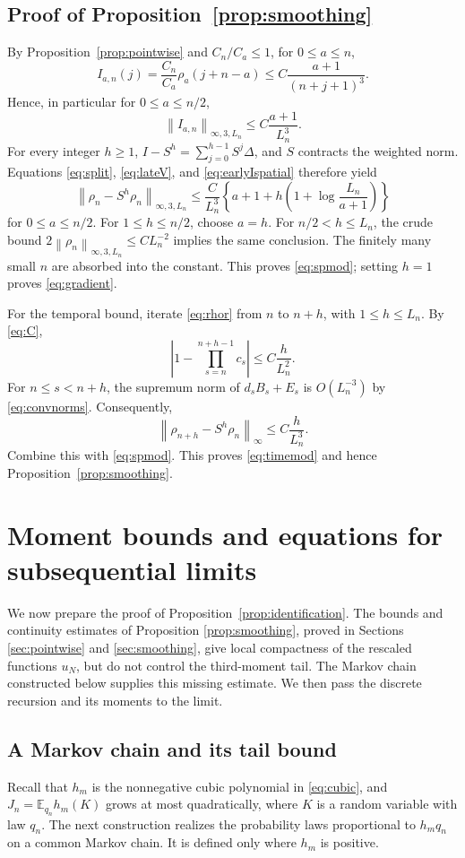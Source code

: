 \documentclass[11pt,letterpaper,reqno]{amsart}
\numberwithin{equation}{section}
\theoremstyle{plain}
\theoremstyle{remark}
\newcommand{\E}{\mathbb E}\newcommand{\Pp}{\mathbb P}
\newcommand{\norm}[1]{\left\lVert#1\right\rVert}
\begin{document}
\subsection{Proof of Proposition~\ref{prop:smoothing}}
By Proposition~\ref{prop:pointwise} and $C_n/C_a\le1$, for $0\le a\le n$,
\[
 I_{a,n}(j)=\frac{C_n}{C_a}\rho_a(j+n-a)
 \le C\frac{a+1}{(n+j+1)^3}.
\]
Hence, in particular for $0\le a\le n/2$,
\begin{equation}\label{eq:earlyIspatial}
 \norm{I_{a,n}}_{\infty,3,L_n}\le C\frac{a+1}{L_n^3}.
\end{equation}
For every integer $h\ge1$, $I-S^h=\sum_{j=0}^{h-1}S^j\Delta$, and $S$ contracts the weighted norm. Equations \eqref{eq:split}, \eqref{eq:lateV}, and \eqref{eq:earlyIspatial} therefore yield
\begin{equation*}
 \norm{\rho_n-S^h\rho_n}_{\infty,3,L_n}
 \le \frac C{L_n^3}\left\{a+1+h\left(1+\log\frac{L_n}{a+1}\right)\right\}
\end{equation*}
for $0\le a\le n/2$. For $1\le h\le n/2$, choose $a=h$. For $n/2<h\le L_n$, the crude bound $2\norm{\rho_n}_{\infty,3,L_n}\le CL_n^{-2}$ implies the same conclusion. The finitely many small $n$ are absorbed into the constant. This proves \eqref{eq:spmod}; setting $h=1$ proves \eqref{eq:gradient}.

For the temporal bound, iterate \eqref{eq:rhor} from $n$ to $n+h$, with $1\le h\le L_n$. By \eqref{eq:C},
\[
 \left|1-\prod_{s=n}^{n+h-1}c_s\right|\le C\frac h{L_n^2}.
\]
For $n\le s<n+h$, the supremum norm of $d_sB_s+E_s$ is $O(L_n^{-3})$ by \eqref{eq:convnorms}. Consequently,
\[
 \norm{\rho_{n+h}-S^h\rho_n}_\infty\le C\frac h{L_n^3}.
\]
Combine this with \eqref{eq:spmod}. This proves \eqref{eq:timemod} and hence Proposition~\ref{prop:smoothing}.

\section{Moment bounds and equations for subsequential limits}\label{sec:limits}
We now prepare the proof of Proposition~\ref{prop:identification}.
%
The bounds and continuity estimates of Proposition \ref{prop:smoothing}, proved in Sections \ref{sec:pointwise} and \ref{sec:smoothing}, give local compactness of the rescaled functions $u_N$, but do not control the third-moment tail.
%
The Markov chain constructed below supplies this missing estimate.
%
We then pass the discrete recursion and its moments to the limit.

\subsection{A Markov chain and its tail bound}
Recall that $h_m$ is the nonnegative cubic polynomial in \eqref{eq:cubic}, and $J_n=\E_{q_n}h_m(K)$ grows at most quadratically, where $K$ is a random variable with law $q_n$. The next construction realizes the probability laws proportional to $h_mq_n$ on a common Markov chain. It is defined only where $h_m$ is positive.
\end{document}
